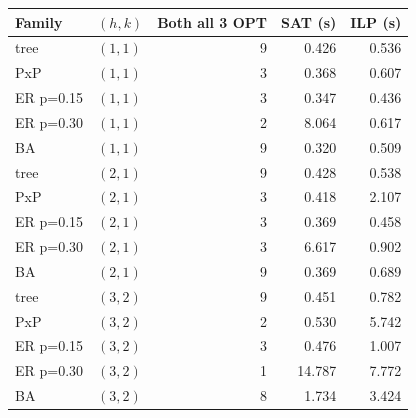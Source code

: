 \begin{tabular}{llrrr}
\toprule
Family & $(h,k)$ & Both all 3 OPT & SAT (s) & ILP (s)\\
\midrule
tree & $(1,1)$ & 9 & 0.426 & 0.536\\
PxP & $(1,1)$ & 3 & 0.368 & 0.607\\
ER p=0.15 & $(1,1)$ & 3 & 0.347 & 0.436\\
ER p=0.30 & $(1,1)$ & 2 & 8.064 & 0.617\\
BA & $(1,1)$ & 9 & 0.320 & 0.509\\
tree & $(2,1)$ & 9 & 0.428 & 0.538\\
PxP & $(2,1)$ & 3 & 0.418 & 2.107\\
ER p=0.15 & $(2,1)$ & 3 & 0.369 & 0.458\\
ER p=0.30 & $(2,1)$ & 3 & 6.617 & 0.902\\
BA & $(2,1)$ & 9 & 0.369 & 0.689\\
tree & $(3,2)$ & 9 & 0.451 & 0.782\\
PxP & $(3,2)$ & 2 & 0.530 & 5.742\\
ER p=0.15 & $(3,2)$ & 3 & 0.476 & 1.007\\
ER p=0.30 & $(3,2)$ & 1 & 14.787 & 7.772\\
BA & $(3,2)$ & 8 & 1.734 & 3.424\\
\bottomrule
\end{tabular}
